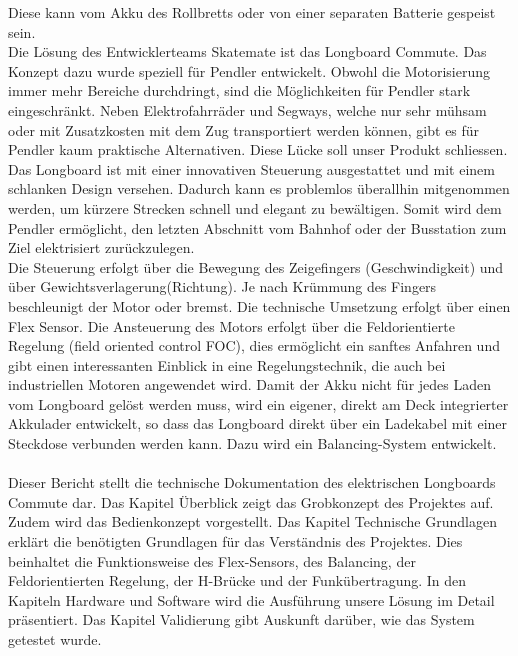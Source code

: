 Diese kann vom Akku des Rollbretts oder von einer separaten Batterie gespeist sein.  \\
Die Lösung des Entwicklerteams Skatemate ist das Longboard Commute. Das Konzept dazu wurde speziell für Pendler entwickelt. Obwohl die Motorisierung immer mehr Bereiche durchdringt, sind die Möglichkeiten für Pendler stark eingeschränkt. Neben Elektrofahrräder und Segways, welche nur sehr mühsam oder mit Zusatzkosten mit dem Zug transportiert werden können, gibt es für Pendler kaum praktische Alternativen. Diese Lücke soll unser Produkt schliessen. Das Longboard ist mit einer innovativen Steuerung ausgestattet und mit einem schlanken Design versehen. Dadurch kann es problemlos überallhin mitgenommen werden, um kürzere Strecken schnell und elegant zu bewältigen. Somit wird dem Pendler ermöglicht, den letzten Abschnitt vom Bahnhof oder der Busstation zum Ziel elektrisiert zurückzulegen. \\
Die Steuerung erfolgt über die Bewegung des Zeigefingers (Geschwindigkeit) und über Gewichtsverlagerung(Richtung). Je nach Krümmung des Fingers beschleunigt der Motor oder bremst. Die technische Umsetzung erfolgt über einen Flex Sensor. Die Ansteuerung des Motors erfolgt über die Feldorientierte Regelung (field oriented control FOC), dies ermöglicht ein sanftes Anfahren und gibt einen interessanten Einblick in eine Regelungstechnik, die auch bei industriellen Motoren angewendet wird. Damit der Akku nicht für jedes Laden vom Longboard gelöst werden muss, wird ein eigener, direkt am Deck integrierter Akkulader entwickelt, so dass das Longboard direkt über ein Ladekabel mit einer Steckdose verbunden werden kann. Dazu wird ein Balancing-System entwickelt.
\\\\
Dieser Bericht stellt die technische Dokumentation des elektrischen Longboards Commute dar. Das Kapitel Überblick zeigt das Grobkonzept des Projektes auf. Zudem wird das Bedienkonzept vorgestellt. Das Kapitel Technische Grundlagen erklärt die benötigten Grundlagen für das Verständnis des Projektes. Dies beinhaltet die Funktionsweise des Flex-Sensors, des Balancing, der Feldorientierten Regelung, der H-Brücke und der Funkübertragung. In den Kapiteln Hardware und Software wird die Ausführung unsere Lösung im Detail präsentiert. Das Kapitel Validierung gibt Auskunft darüber, wie das System getestet wurde. 
